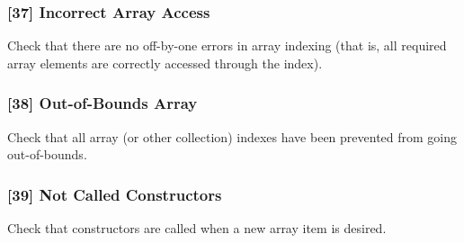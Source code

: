\subsubsection{[37] Incorrect Array Access}
Check that there are no off-by-one errors in array indexing (that is, all required array elements are correctly accessed through the index).
\subsubsection{[38] Out-of-Bounds Array}
Check that all array (or other collection) indexes have been prevented from going out-of-bounds.
\subsubsection{[39] Not Called Constructors}
Check that constructors are called when a new array item is desired.